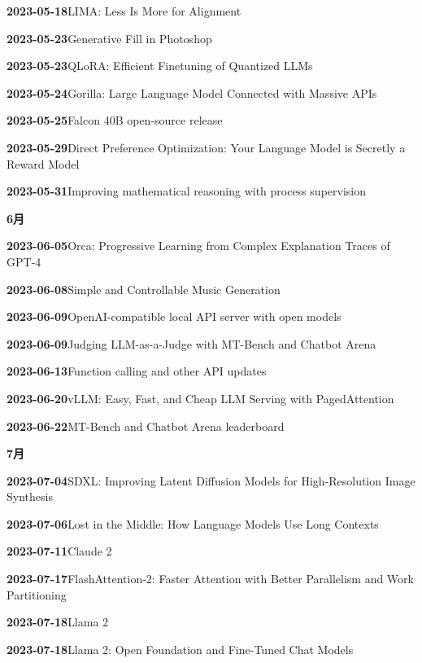 \noindent\textbf{2023-05-18}\quad LIMA: Less Is More for Alignment\par
\noindent\textbf{2023-05-23}\quad Generative Fill in Photoshop\par
\noindent\textbf{2023-05-23}\quad QLoRA: Efficient Finetuning of Quantized LLMs\par
\noindent\textbf{2023-05-24}\quad Gorilla: Large Language Model Connected with Massive APIs\par
\noindent\textbf{2023-05-25}\quad Falcon 40B open-source release\par
\noindent\textbf{2023-05-29}\quad Direct Preference Optimization: Your Language Model is Secretly a Reward Model\par
\noindent\textbf{2023-05-31}\quad Improving mathematical reasoning with process supervision\par
\medskip
\noindent\textbf{6月}\par
\smallskip
\noindent\textbf{2023-06-05}\quad Orca: Progressive Learning from Complex Explanation Traces of GPT-4\par
\noindent\textbf{2023-06-08}\quad Simple and Controllable Music Generation\par
\noindent\textbf{2023-06-09}\quad OpenAI-compatible local API server with open models\par
\noindent\textbf{2023-06-09}\quad Judging LLM-as-a-Judge with MT-Bench and Chatbot Arena\par
\noindent\textbf{2023-06-13}\quad Function calling and other API updates\par
\noindent\textbf{2023-06-20}\quad vLLM: Easy, Fast, and Cheap LLM Serving with PagedAttention\par
\noindent\textbf{2023-06-22}\quad MT-Bench and Chatbot Arena leaderboard\par
\medskip
\noindent\textbf{7月}\par
\smallskip
\noindent\textbf{2023-07-04}\quad SDXL: Improving Latent Diffusion Models for High-Resolution Image Synthesis\par
\noindent\textbf{2023-07-06}\quad Lost in the Middle: How Language Models Use Long Contexts\par
\noindent\textbf{2023-07-11}\quad Claude 2\par
\noindent\textbf{2023-07-17}\quad FlashAttention-2: Faster Attention with Better Parallelism and Work Partitioning\par
\noindent\textbf{2023-07-18}\quad Llama 2\par
\noindent\textbf{2023-07-18}\quad Llama 2: Open Foundation and Fine-Tuned Chat Models\par
